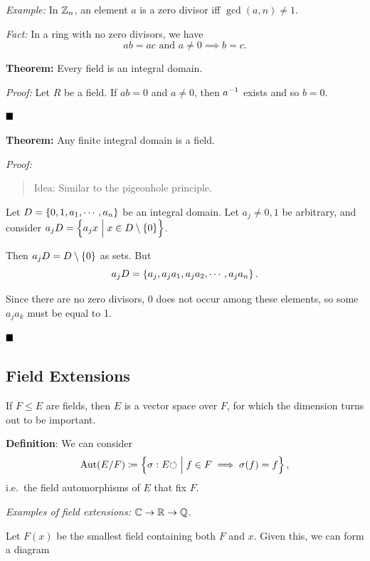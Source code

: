 \emph{Example:} In \({\mathbb{Z}}_n\), an element \(a\) is a zero divisor iff
\(\gcd(a, n) \neq 1\).

\emph{Fact:} In a ring with no zero divisors, we have \[
ab = ac \text{ and } a\neq 0 \implies b=c
.\]

\textbf{Theorem:} Every field is an integral domain.

\emph{Proof:} Let \(R\) be a field. If \(ab=0\) and \(a\neq 0\), then
\(a^{-1}\) exists and so \(b=0\).

\(\qed\)

\textbf{Theorem:} Any finite integral domain is a field.

\emph{Proof:}

\begin{quote}
Idea: Similar to the pigeonhole principle.
\end{quote}

Let \(D = \left\{{0, 1, a_1, \cdots, a_n}\right\}\) be an integral domain. Let
\(a_j \neq 0, 1\) be arbitrary, and consider
\(a_j D = \left\{{a_j x \mathrel{\Big|} x\in D\setminus\left\{{0}\right\}}\right\}\).

Then \(a_j D = D\setminus\left\{{0}\right\}\) as sets. But \[
a_j D = \left\{{a_j, a_j a_1, a_j a_2, \cdots, a_j a_n}\right\}.
\]

Since there are no zero divisors, \(0\) does not occur among these
elements, so some \(a_j a_k\) must be equal to 1.

\(\qed\)

\hypertarget{field-extensions}{%
\subsection{Field Extensions}\label{field-extensions}}

If \(F \leq E\) are fields, then \(E\) is a vector space over \(F\), for
which the dimension turns out to be important.

\textbf{Definition}: We can consider \[
\mathrm{Aut}(E/F) \coloneqq \left\{{\sigma: E {\circlearrowleft} \mathrel{\Big|} f\in F \implies \sigma(f) = f}\right\},
\] i.e.~the field automorphisms of \(E\) that fix \(F\).

\emph{Examples of field extensions:} \({\mathbb{C}} \to {\mathbb{R}} \to {\mathbb{Q}}\).

Let \(F(x)\) be the smallest field containing both \(F\) and \(x\).
Given this, we can form a diagram

\begin{center}
\end{center}

